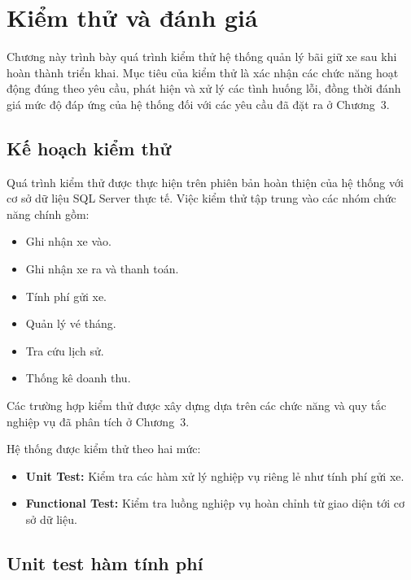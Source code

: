 \chapter{Kiểm thử và đánh giá}


Chương này trình bày quá trình kiểm thử hệ thống quản lý bãi giữ xe
sau khi hoàn thành triển khai. Mục tiêu của kiểm thử là xác nhận các
chức năng hoạt động đúng theo yêu cầu, phát hiện và xử lý các tình
huống lỗi, đồng thời đánh giá mức độ đáp ứng của hệ thống đối với
các yêu cầu đã đặt ra ở Chương~3.

\section{Kế hoạch kiểm thử}

Quá trình kiểm thử được thực hiện trên phiên bản hoàn thiện của hệ
thống với cơ sở dữ liệu SQL Server thực tế. Việc kiểm thử tập trung
vào các nhóm chức năng chính gồm:

\begin{itemize}
    \item Ghi nhận xe vào.
    \item Ghi nhận xe ra và thanh toán.
    \item Tính phí gửi xe.
    \item Quản lý vé tháng.
    \item Tra cứu lịch sử.
    \item Thống kê doanh thu.
\end{itemize}

Các trường hợp kiểm thử được xây dựng dựa trên các chức năng và
quy tắc nghiệp vụ đã phân tích ở Chương~3.

Hệ thống được kiểm thử theo hai mức:

\begin{itemize}
    \item \textbf{Unit Test:} Kiểm tra các hàm xử lý nghiệp vụ riêng
    lẻ như tính phí gửi xe.

    \item \textbf{Functional Test:} Kiểm tra luồng nghiệp vụ hoàn
    chỉnh từ giao diện tới cơ sở dữ liệu.
\end{itemize}

\section{Unit test hàm tính phí}

